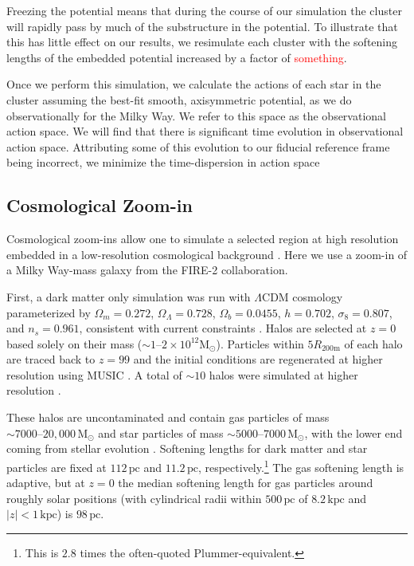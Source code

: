 \documentclass[twocolumn]{aastex62}
\newcommand{\Gus}[1]{\textcolor{red}{#1}}
\newcommand{\Msun}{\text{M}_\odot}
\newcommand{\pc}{\text{pc}}
\newcommand{\kpc}{\text{kpc}}
\newcommand{\abs}[1]{\left| #1 \right|}
\newcommand{\z}{z}
\begin{document}
Freezing the potential means that during the course of our simulation the
cluster will rapidly pass by much of the substructure in the potential. To
illustrate that this has little effect on our results, we resimulate each
cluster with the softening lengths of the embedded potential increased by a
factor of \Gus{something}.

Once we perform this simulation, we calculate the actions of each star in the
cluster assuming the best-fit smooth, axisymmetric potential, as we do
observationally for the Milky Way. We refer to this space as the observational
action space. We will find that there is significant time evolution in
observational action space. Attributing some of this evolution to our fiducial
reference frame being incorrect, we minimize the time-dispersion in action
space

\subsection{Cosmological Zoom-in} \label{ssec:cosmozoom}
Cosmological zoom-ins allow one to simulate a selected region at high
resolution embedded in a low-resolution cosmological background
\citep[e.g.][]{1993ApJ...412..455K,2014MNRAS.437.1894O}. Here we use a
zoom-in of a Milky Way-mass galaxy from the FIRE-2 collaboration.

First, a dark matter only simulation was run with $\Lambda$CDM cosmology
parameterized by $\Omega_m = 0.272$, $\Omega_{\Lambda} = 0.728$, $\Omega_b =
0.0455$, $h = 0.702$, $\sigma_8 = 0.807$, and $n_s = 0.961$, consistent with
current constraints \citep{2018arXiv180706209P}. Halos are selected at $z=0$
based solely on their mass ($\sim 1\text{--}2 \times 10^{12} \Msun$).
Particles within $5 R_{200\text{m}}$ of each halo are traced back to $\z=99$
and the initial conditions are regenerated at higher resolution using MUSIC
\citep{2011MNRAS.415.2101H}. A total of $\sim 10$ halos were simulated at
higher resolution \citep{2018MNRAS.481.4133G}.

These halos are uncontaminated and contain gas particles of mass $\sim 7000
\text{--} 20,000\,\Msun$ and star particles of mass $\sim 5000 \text{--} 7000\,
\Msun$, with the lower end coming from stellar evolution
\citep{2018arXiv180610564S}. Softening lengths for dark matter and star
particles are fixed at $112\,\pc$ and $11.2\,\pc$,
respectively.\footnote{This is $2.8$ times the often-quoted
Plummer-equivalent.} The gas softening length is adaptive, but at $z=0$ the
median softening length for gas particles around roughly solar positions
(with cylindrical radii within $500\,\pc$ of $8.2\,\kpc$ and
$\abs{z}<1\,\kpc$) is $98\,\pc$.
\end{document}
